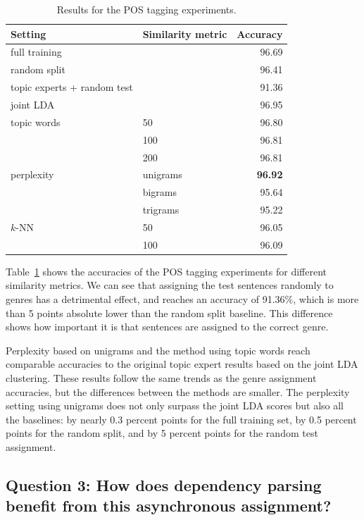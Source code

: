 \begin{table}[!t]
\centering
\begin{tabular}{l|l|r|}
Setting & Similarity metric & Accuracy \\ \hline
full training &  & 96.69 \\ 
random split & & 96.41 \\ 
topic experts + random test &  & 91.36 \\ \hline
joint LDA &   & 96.95 \\ \hline
topic words & 50 & 96.80 \\ 
 & 100 & 96.81 \\ 
 & 200 & 96.81 \\ \hline
perplexity & unigrams & \textbf{96.92} \\ 
 & bigrams & 95.64 \\
 & trigrams & 95.22 \\ \hline
$k$-NN & 50 & 96.05 \\  
 & 100 & 96.09 \\ \hline
\end{tabular}

\caption{Results for the POS tagging experiments.}
\label{tab:overallresultspostag}
\end{table}

Table~\ref{tab:overallresultspostag} shows the accuracies of the POS tagging experiments for different similarity metrics. We can see that assigning the test sentences randomly to genres has a detrimental effect, and reaches an accuracy of 91.36\%, which is more than 5 points absolute lower than the random split baseline. This difference shows how important it is that sentences are assigned to the correct genre.
 
Perplexity based on unigrams and the method using topic words reach comparable accuracies to the original topic expert results based on the joint LDA clustering. These results follow the same trends as the genre assignment accuracies, but the differences between the methods are smaller. The perplexity setting using unigrams does not only surpass the joint LDA scores but also all the baselines: by nearly 0.3 percent points for the full training set, by 0.5 percent points  for the random split, and by 5 percent points  for the random test assignment.





\subsection*{Question 3: How does dependency parsing benefit from this asynchronous assignment?}

